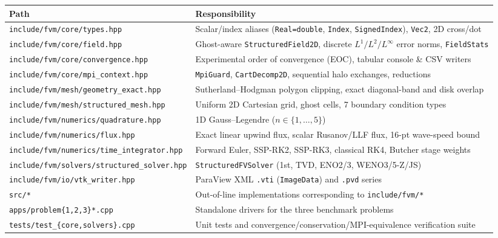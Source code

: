 \documentclass[11pt,a4paper]{article}
\theoremstyle{definition}
\newcommand{\code}[1]{\texttt{#1}}
\begin{document}
\begin{center}
\footnotesize
\begin{tabular}{@{}l >{\raggedright\arraybackslash}p{}@{}}
\toprule
\textbf{Path} & \textbf{Responsibility} \\
\midrule
\code{include/fvm/core/types.hpp} & Scalar/index aliases (\code{Real=double}, \code{Index}, \code{SignedIndex}), \code{Vec2}, 2D cross/dot \\
\code{include/fvm/core/field.hpp} & Ghost-aware \code{StructuredField2D}, discrete $L^1/L^2/L^\infty$ error norms, \code{FieldStats} \\
\code{include/fvm/core/convergence.hpp} & Experimental order of convergence (EOC), tabular console \& CSV writers \\
\code{include/fvm/core/mpi\_context.hpp} & \code{MpiGuard}, \code{CartDecomp2D}, sequential halo exchanges, reductions \\
\code{include/fvm/mesh/geometry\_exact.hpp} & Sutherland--Hodgman polygon clipping, exact diagonal-band and disk overlap \\
\code{include/fvm/mesh/structured\_mesh.hpp} & Uniform 2D Cartesian grid, ghost cells, 7 boundary condition types \\
\code{include/fvm/numerics/quadrature.hpp} & 1D Gauss--Legendre ($n\in\{1,\dots,5\}$) \\
\code{include/fvm/numerics/flux.hpp} & Exact linear upwind flux, scalar Rusanov/LLF flux, 16-pt wave-speed bound \\
\code{include/fvm/numerics/time\_integrator.hpp} & Forward Euler, SSP-RK2, SSP-RK3, classical RK4, Butcher stage weights \\
\code{include/fvm/solvers/structured\_solver.hpp} & \code{StructuredFVSolver} (1st, TVD, ENO2/3, WENO3/5-Z/JS) \\
\code{include/fvm/io/vtk\_writer.hpp} & ParaView XML \code{.vti} (\code{ImageData}) and \code{.pvd} series \\
\code{src/*} & Out-of-line implementations corresponding to \code{include/fvm/*} \\
\code{apps/problem\{1,2,3\}*.cpp} & Standalone drivers for the three benchmark problems \\
\code{tests/test\_\{core,solvers\}.cpp} & Unit tests and convergence/conservation/MPI-equivalence verification suite \\
\bottomrule
\end{tabular}
\end{center}
\end{document}
